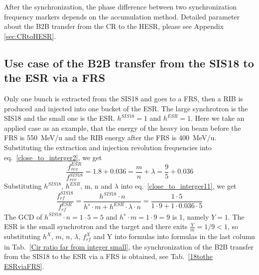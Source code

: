 After the synchronization, the phase difference between two synchronization frequency markers depends on the accumulation method. Detailed parameter about the B2B transfer from the CR to the HESR, please see Appendix \ref{sec:CRtoHESR}. 
\subsection{Use case of the B2B transfer from the SIS18 to the ESR via a FRS} 
Only one bunch is extracted from the SIS18 and goes to a FRS, then a RIB is produced and injected into one bucket of the ESR. The large synchrotron is the SIS18 and the small one is the ESR. $h^{\mathit{SIS18}}=1$ and $h^{\mathit{ESR}}=1$. Here we take an applied case as an example, that the energy of the heavy ion beam before the FRS is \SI{550}{MeV/\atomicmassunit} and the RIB energy after the FRS is \SI{400}{MeV/\atomicmassunit}. Substituting the extraction and injection revolution frequencies into eq.~\ref{close_to_interger2}, we get
\begin{equation} 
\frac{f_{\mathit{rev}}^{\mathit{ESR}}}{f_{\mathit{rev}}^{\mathit{SIS18}}}=1.8+0.036=\frac{m}{n}+ \lambda=\frac{9}{5}+0.036
\end{equation}
Substituting $h^{\mathit{SIS18}}$, $h^{\mathit{ESR}}$, m, n and $\lambda$ into eq.~\ref{close_to_interger11}, we get
\begin{equation}
\frac{f_{\mathit{rf}}^{\mathit{SIS18}}}{f_{\mathit{rf}}^{\mathit{ESR}}}=\frac{h^{\mathit{SIS18}}\cdot n}{h^s \cdot m+ h^{\mathit{ESR}} \cdot\lambda\cdot n}=\frac{1\cdot 5}{1 \cdot 9+1 \cdot0.036\cdot 5}
\end{equation}
The GCD of $h^{\mathit{SIS18}}\cdot n=1\cdot5=5$ and $h^s \cdot m=1\cdot 9=9$ is 1, namely $Y=1$. The ESR is the small synchrotron and the target and there exits $\frac{Y}{m}=1/9<1$, so substituting $h^X$, $m$, $n$, $\lambda$, $f_{\mathit{rf}}^{X}$ and Y into formulas into formulas in the last column in Tab.~\ref{Cir ratio far from integer small}, the synchronization of the B2B transfer from the SIS18 to the ESR via a FRS is obtained, see Tab.~\ref{18tothe ESRviaFRS}.
